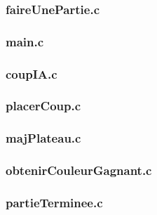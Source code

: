 \subsubsection{faireUnePartie.c}

\vline

\subsubsection{main.c}

\vline

\subsubsection{coupIA.c}

\vline

\subsubsection{placerCoup.c}

\vline

\subsubsection{majPlateau.c}

\vline

\subsubsection{obtenirCouleurGagnant.c}

\vline

\subsubsection{partieTerminee.c}

\vline

